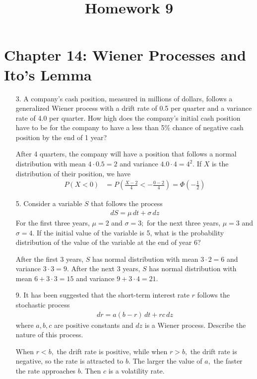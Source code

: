 \documentclass{article}
\begin{document}
\title{Homework 9}
\maketitle
\thispagestyle{fancy}

\section*{Chapter 14: Wiener Processes and Ito's Lemma}

\begin{itemize}
	\item[3.] A company's cash position, measured in millions of dollars, follows a generalized Wiener process with a drift rate of 0.5 per quarter and a variance rate of 4.0 per quarter. How high does the company's initial cash position have to be for the company to have a less than 5\% chance of negative cash position by the end of 1 year?
		\begin{soln}
			After 4 quarters, the company will have a position that follows a normal distribution with mean $4\cdot 0.5=2$ and variance $4.0\cdot 4 = 4^2.$ If $X$ is the distribution of their position, we have
			\begin{align*}
				P(X<0) &= P\left( \frac{X-2}{4} < -\frac{0-2}{4} \right) = \Phi\left( -\frac{1}{2} \right)
			\end{align*}
		\end{soln}

	\item[5.] Consider a variable $S$ that follows the process
		\begin{align*}
			dS = \mu \, dt + \sigma \, dz
		\end{align*}
		For the first three years, $\mu=2$ and $\sigma=3;$ for the next three years, $\mu=3$ and $\sigma=4.$ If the initial value of the variable is 5, what is the probability distribution of the value of the variable at the end of year 6?
		\begin{soln}
			After the first 3 years, $S$ has normal distribution with mean $3\cdot 2=6$ and variance $3\cdot 3 = 9.$ After the next 3 years, $S$ has normal distribution with mean $6+3\cdot 3=15$ and variance $9+3\cdot 4 = 21.$
		\end{soln}

	\item[9.] It has been suggested that the short-term interest rate $r$ follows the stochastic process
		\begin{align*}
			dr = a(b-r)\, dt + rc\, dz
		\end{align*}
		where $a, b, c$ are positive constants and $dz$ is a Wiener process. Describe the nature of this process.
		\begin{soln}
			When $r<b,$ the drift rate is positive, while when $r>b,$ the drift rate is negative, so the rate is attracted to $b.$ The larger the value of $a,$ the faster the rate approaches $b.$ Then $c$ is a volatility rate.
		\end{soln}


\end{itemize}
\end{document}
